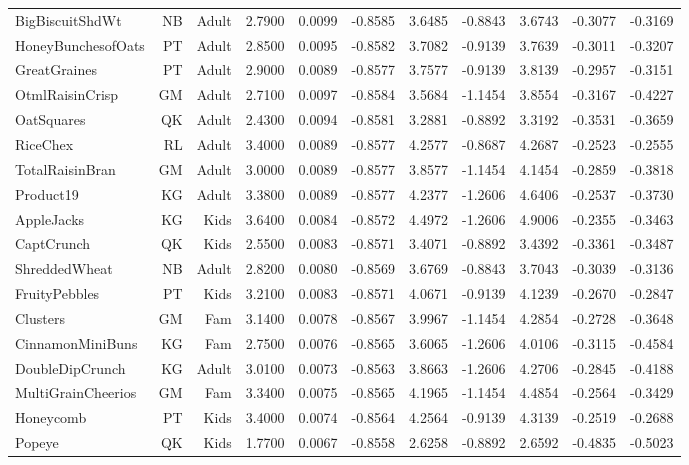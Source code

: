 \begin{longtable}{@{}lrrrrrrrrrr@{}}
BigBiscuitShdWt & NB & Adult & 2.7900 & 0.0099 & -0.8585 & 3.6485 & -0.8843 & 3.6743 & -0.3077 & -0.3169 \\
HoneyBunchesofOats & PT & Adult & 2.8500 & 0.0095 & -0.8582 & 3.7082 & -0.9139 & 3.7639 & -0.3011 & -0.3207 \\
GreatGraines & PT & Adult & 2.9000 & 0.0089 & -0.8577 & 3.7577 & -0.9139 & 3.8139 & -0.2957 & -0.3151 \\
OtmlRaisinCrisp & GM & Adult & 2.7100 & 0.0097 & -0.8584 & 3.5684 & -1.1454 & 3.8554 & -0.3167 & -0.4227 \\
OatSquares & QK & Adult & 2.4300 & 0.0094 & -0.8581 & 3.2881 & -0.8892 & 3.3192 & -0.3531 & -0.3659 \\
RiceChex & RL & Adult & 3.4000 & 0.0089 & -0.8577 & 4.2577 & -0.8687 & 4.2687 & -0.2523 & -0.2555 \\
TotalRaisinBran & GM & Adult & 3.0000 & 0.0089 & -0.8577 & 3.8577 & -1.1454 & 4.1454 & -0.2859 & -0.3818 \\
Product19 & KG & Adult & 3.3800 & 0.0089 & -0.8577 & 4.2377 & -1.2606 & 4.6406 & -0.2537 & -0.3730 \\
AppleJacks & KG & Kids & 3.6400 & 0.0084 & -0.8572 & 4.4972 & -1.2606 & 4.9006 & -0.2355 & -0.3463 \\
CaptCrunch & QK & Kids & 2.5500 & 0.0083 & -0.8571 & 3.4071 & -0.8892 & 3.4392 & -0.3361 & -0.3487 \\
ShreddedWheat & NB & Adult & 2.8200 & 0.0080 & -0.8569 & 3.6769 & -0.8843 & 3.7043 & -0.3039 & -0.3136 \\
FruityPebbles & PT & Kids & 3.2100 & 0.0083 & -0.8571 & 4.0671 & -0.9139 & 4.1239 & -0.2670 & -0.2847 \\
Clusters & GM & Fam & 3.1400 & 0.0078 & -0.8567 & 3.9967 & -1.1454 & 4.2854 & -0.2728 & -0.3648 \\
CinnamonMiniBuns & KG & Fam & 2.7500 & 0.0076 & -0.8565 & 3.6065 & -1.2606 & 4.0106 & -0.3115 & -0.4584 \\
DoubleDipCrunch & KG & Adult & 3.0100 & 0.0073 & -0.8563 & 3.8663 & -1.2606 & 4.2706 & -0.2845 & -0.4188 \\
MultiGrainCheerios & GM & Fam & 3.3400 & 0.0075 & -0.8565 & 4.1965 & -1.1454 & 4.4854 & -0.2564 & -0.3429 \\
Honeycomb & PT & Kids & 3.4000 & 0.0074 & -0.8564 & 4.2564 & -0.9139 & 4.3139 & -0.2519 & -0.2688 \\
Popeye & QK & Kids & 1.7700 & 0.0067 & -0.8558 & 2.6258 & -0.8892 & 2.6592 & -0.4835 & -0.5023 \\
\bottomrule
\end{longtable}
\endgroup
